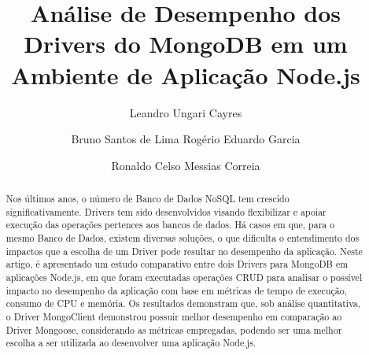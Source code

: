 \documentclass{svproc}
\begin{document}
\mainmatter              %
%
\title{Análise de Desempenho dos Drivers do MongoDB em um Ambiente de Aplicação Node.js}
%
%
\author{Leandro Ungari Cayres \and Bruno Santos de Lima Rogério Eduardo Garcia \and Ronaldo Celso Messias Correia}
%
%
%

\maketitle              %

\begin{abstract}
Nos últimos anos, o número de Banco de Dados NoSQL tem crescido significativamente. Drivers tem sido desenvolvidos visando flexibilizar e apoiar execução das operações pertences aos bancos de dados. Há casos em que, para o mesmo Banco de Dados, existem diversas soluções, o que dificulta o entendimento dos impactos que a escolha de um Driver pode resultar no desempenho da aplicação. Neste artigo, é apresentado um estudo comparativo entre dois Drivers para MongoDB em aplicações Node.js, em que foram executadas operações CRUD para analisar o possível impacto no desempenho da aplicação com base em métricas de tempo de execução, consumo de CPU e memória. Os resultados demonstram que, sob análise quantitativa, o Driver MongoClient demonstrou possuir melhor desempenho em comparação ao Driver Mongoose, considerando as métricas empregadas, podendo ser uma melhor escolha a ser utilizada ao desenvolver uma aplicação Node.js.
\end{abstract}
%
\end{document}
